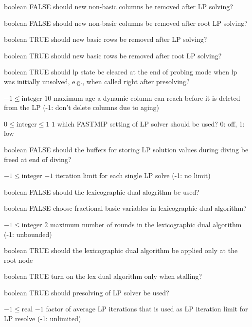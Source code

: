 %
{boolean}%
{FALSE}%
{should new non-basic columns be removed after LP solving?}%
{}

%
{boolean}%
{FALSE}%
{should new non-basic columns be removed after root LP solving?}%
{}

%
{boolean}%
{TRUE}%
{should new basic rows be removed after LP solving?}%
{}

%
{boolean}%
{TRUE}%
{should new basic rows be removed after root LP solving?}%
{}

%
{boolean}%
{TRUE}%
{should lp state be cleared at the end of probing mode when lp was initially unsolved, e.g., when called right after presolving?}%
{}

%
{$-1\leq\textrm{integer}$}%
{$10$}%
{maximum age a dynamic column can reach before it is deleted from the LP (-1: don't delete columns due to aging)}%
{}

%
{$0\leq\textrm{integer}\leq1$}%
{$1$}%
{which FASTMIP setting of LP solver should be used? 0: off, 1: low}%
{}

%
{boolean}%
{FALSE}%
{should the buffers for storing LP solution values during diving be freed at end of diving?}%
{}

%
{$-1\leq\textrm{integer}$}%
{$-1$}%
{iteration limit for each single LP solve (-1: no limit)}%
{}

%
{boolean}%
{FALSE}%
{should the lexicographic dual alogrithm be used?}%
{}

%
{boolean}%
{FALSE}%
{choose fractional basic variables in lexicographic dual algorithm?}%
{}

%
{$-1\leq\textrm{integer}$}%
{$2$}%
{maximum number of rounds in the  lexicographic dual algorithm (-1: unbounded)}%
{}

%
{boolean}%
{TRUE}%
{should the lexicographic dual algorithm be applied only at the root node}%
{}

%
{boolean}%
{TRUE}%
{turn on the lex dual algorithm only when stalling?}%
{}

%
{boolean}%
{TRUE}%
{should presolving of LP solver be used?}%
{}

%
{$-1\leq\textrm{real}$}%
{$-1$}%
{factor of average LP iterations that is used as LP iteration limit for LP resolve (-1: unlimited)}%
{}


